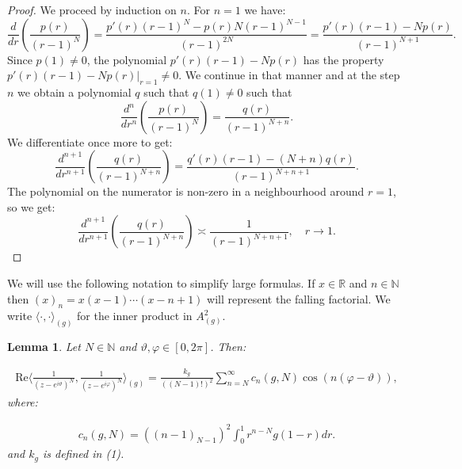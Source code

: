 \documentclass{amsart}[11pt]
\newcommand{\N}{\mathbb{N}} %
\newcommand{\vphi}{\varphi}
\newcommand{\vth}{\vartheta}
\newcommand{\ra}{\rightarrow}
\newtheorem{lemma}[theorem]{Lemma}
\theoremstyle{definition}
\begin{document}
\begin{proof}
We proceed by induction on \( n \). For \( n = 1 \) we have:
\[
\frac{d}{dr} \left( \frac{p(r)}{(r - 1)^N} \right) =
\frac{p'(r)(r - 1)^N - p(r)N(r - 1)^{N-1}}{(r - 1)^{2N}}
= \frac{p'(r)(r - 1) - Np(r)}{(r - 1)^{N+1}}.
\]
Since \( p(1) \neq 0 \), the polynomial \( p'(r)(r - 1) - Np(r) \) has the property
\( p'(r)(r - 1) - Np(r) \big|_{r=1} \neq 0 \). We continue in that manner and at the step \( n \) we obtain a polynomial \( q \) such that \( q(1) \neq 0 \) such that
\[
\frac{d^n}{dr^n} \left( \frac{p(r)}{(r - 1)^N} \right) =
\frac{q(r)}{(r - 1)^{N+n}}.
\]
We differentiate once more to get:
\[
\frac{d^{n+1}}{dr^{n+1}} \left( \frac{q(r)}{(r - 1)^{N+n}} \right) =
\frac{q'(r)(r - 1) - (N + n)q(r)}{(r - 1)^{N+n+1}}.
\]
The polynomial on the numerator is non-zero in a neighbourhood around \( r = 1 \), so we get:
\[
\frac{d^{n+1}}{dr^{n+1}} \left( \frac{q(r)}{(r - 1)^{N+n}} \right) \asymp \frac{1}{(r - 1)^{N+n+1}}, \quad r \ra 1.
\]
\end{proof}

We will use the following notation to simplify large formulas. If $x \in \mathbb{R}$ and $n \in \mathbb{N}$ then
$(x)_n = x(x - 1) \cdots (x - n + 1)$ will represent the falling factorial. We write $\langle \cdot , \cdot \rangle_{(g)}$ for the inner product in $A^2_{(g)}$.

\begin{lemma}
Let $N \in \N$ and $\vth, \vphi \in [0,2\pi]$. Then:

\begin{gather*}
\text{Re} \bigg\langle \frac{1}{(z-e^{i \vth})^N},\frac{1}{(z-e^{i \vphi})^N} \bigg \rangle_{(g)} = \frac{k_g}{((N-1)!)^2} \sum_{n=N}^{\infty} c_n(g,N) \cos(n(\vphi - \vth)),
\end{gather*}
where:

\begin{gather}
c_n(g,N) = ((n-1)_{N-1})^2\int_0^1 r^{n-N}g(1-r)dr.
\end{gather}
and $k_g$ is defined in (1).
\end{lemma}
\end{document}
